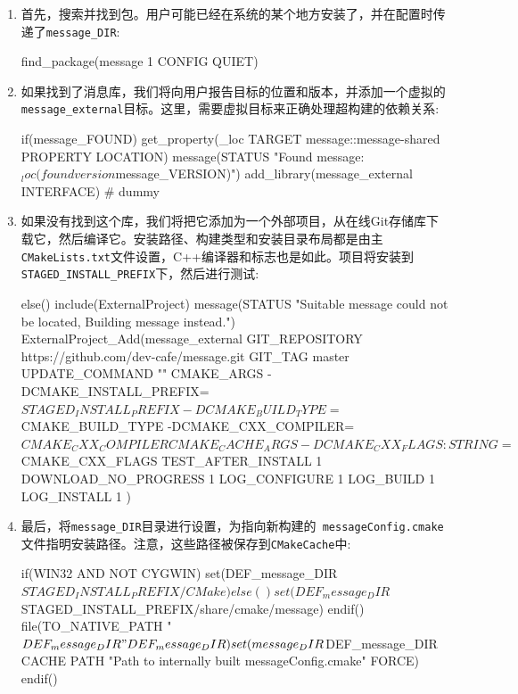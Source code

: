 \begin{enumerate}
\item 首先，搜索并找到包。用户可能已经在系统的某个地方安装了，并在配置时传递了\texttt{message\_DIR}:

\begin{codebox}[cmake]
find_package(message 1 CONFIG QUIET)
\end{codebox}

\item 如果找到了消息库，我们将向用户报告目标的位置和版本，并添加一个虚拟的\texttt{message\_external}目标。这里，需要虚拟目标来正确处理超构建的依赖关系:

\begin{codebox}[cmake]
if(message_FOUND)
  get_property(_loc TARGET message::message-shared PROPERTY LOCATION)
  message(STATUS "Found message: ${_loc} (found version ${message_VERSION})")
  add_library(message_external INTERFACE) # dummy
\end{codebox}

\item 如果没有找到这个库，我们将把它添加为一个外部项目，从在线Git存储库下载它，然后编译它。安装路径、构建类型和安装目录布局都是由主\texttt{CMakeLists.txt}文件设置，C++编译器和标志也是如此。项目将安装到\texttt{STAGED\_INSTALL\_PREFIX}下，然后进行测试:

\begin{codebox}[cmake]
else()
  include(ExternalProject)
  message(STATUS "Suitable message could not be located, Building message instead.")
  ExternalProject_Add(message_external
    GIT_REPOSITORY
      https://github.com/dev-cafe/message.git
    GIT_TAG
      master
    UPDATE_COMMAND
      ""
    CMAKE_ARGS
      -DCMAKE_INSTALL_PREFIX=${STAGED_INSTALL_PREFIX}
      -DCMAKE_BUILD_TYPE=${CMAKE_BUILD_TYPE}
      -DCMAKE_CXX_COMPILER=${CMAKE_CXX_COMPILER}
    CMAKE_CACHE_ARGS
      -DCMAKE_CXX_FLAGS:STRING=${CMAKE_CXX_FLAGS}
    TEST_AFTER_INSTALL
      1
    DOWNLOAD_NO_PROGRESS
      1
    LOG_CONFIGURE
      1
    LOG_BUILD
      1
    LOG_INSTALL
      1
  )
\end{codebox}

\item 最后，将\texttt{message\_DIR}目录进行设置，为指向新构建的\texttt{ messageConfig.cmake}文件指明安装路径。注意，这些路径被保存到\texttt{CMakeCache}中:

\begin{codebox}[cmake]
  if(WIN32 AND NOT CYGWIN)
    set(DEF_message_DIR ${STAGED_INSTALL_PREFIX}/CMake)
  else()
    set(DEF_message_DIR ${STAGED_INSTALL_PREFIX}/share/cmake/message)
  endif()
  file(TO_NATIVE_PATH "${DEF_message_DIR}" DEF_message_DIR)
  set(message_DIR ${DEF_message_DIR}
    CACHE PATH "Path to internally built messageConfig.cmake" FORCE)
endif()
\end{codebox}

\end{enumerate}

